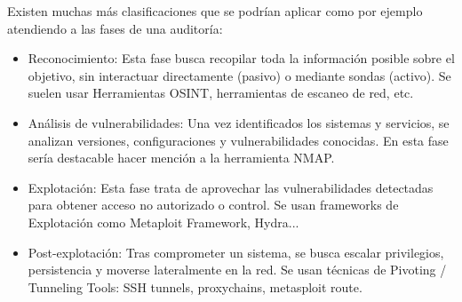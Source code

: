 \documentclass[runningheads]{llncs}
\begin{document}
Existen muchas más clasificaciones que se podrían aplicar como por ejemplo atendiendo a las fases de una auditoría: 
\begin{itemize}
    \item Reconocimiento: Esta fase busca recopilar toda la información posible sobre el objetivo, sin interactuar directamente (pasivo) o mediante sondas (activo). Se suelen usar Herramientas OSINT, herramientas de escaneo de red, etc.
    \item Análisis de vulnerabilidades: Una vez identificados los sistemas y servicios, se analizan versiones, configuraciones y vulnerabilidades conocidas. En esta fase sería destacable hacer mención a la herramienta NMAP.
    \item Explotación: Esta fase trata de aprovechar las vulnerabilidades detectadas para obtener acceso no autorizado o control. Se usan frameworks de Explotación como Metaploit Framework, Hydra...
    \item Post-explotación: Tras comprometer un sistema, se busca escalar privilegios, persistencia y moverse lateralmente en la red. Se usan técnicas de Pivoting / Tunneling Tools: SSH tunnels, proxychains, metasploit route.
\end{itemize}
\end{document}
